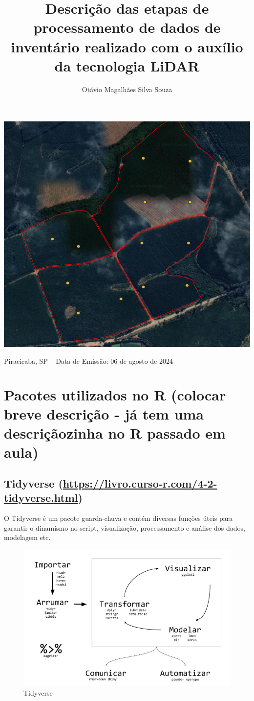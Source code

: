 \documentclass[
]{article}
\title{Descrição das etapas de processamento de dados de inventário
realizado com o auxílio da tecnologia LiDAR}
\author{Otávio Magalhães Silva Souza}
\date{}
\begin{document}
\maketitle

\begin{center}\includegraphics[width=0.4\linewidth]{IMAGES/CAPA} \end{center}

\centerline {Piracicaba, SP – Data de Emissão: 06 de agosto de 2024}
\newpage

\tableofcontents

\newpage

\section{Pacotes utilizados no R (colocar breve descrição - já tem uma
descriçãozinha no R passado em
aula)}\label{pacotes-utilizados-no-r-colocar-breve-descriuxe7uxe3o---juxe1-tem-uma-descriuxe7uxe3ozinha-no-r-passado-em-aula}

\subsection{\texorpdfstring{Tidyverse
(\url{https://livro.curso-r.com/4-2-tidyverse.html})}{Tidyverse (https://livro.curso-r.com/4-2-tidyverse.html)}}\label{tidyverse-httpslivro.curso-r.com4-2-tidyverse.html}

O Tidyverse é um pacote guarda-chuva e contém diversas funções úteis
para garantir o dinamismo no script, visualização, processamento e
análise dos dados, modelagem etc.

\begin{figure}

{\centering \includegraphics[width=0.6\linewidth]{IMAGES/tidyverse} 

}

\caption{Tidyverse}\label{fig:unnamed-chunk-2}
\end{figure}
\end{document}
